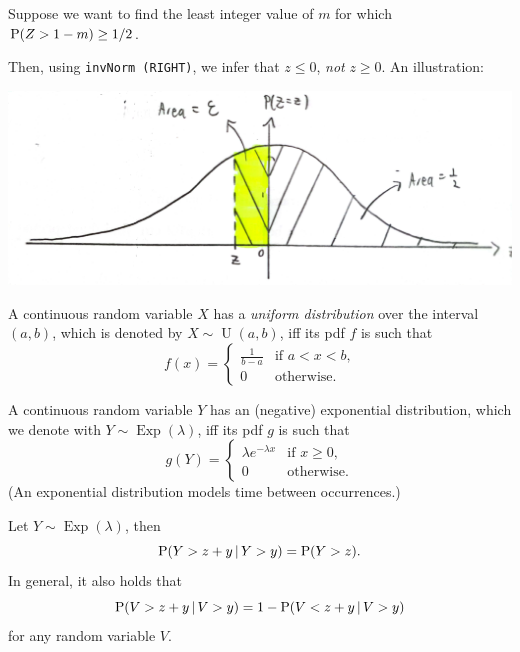 \documentclass[../Notes.tex]{subfiles}
\begin{document}
\begin{example}{}{}
  Suppose we want to find the least integer value of \(m\) for which \(\operatorname{P}(Z>1-m)\geq 1/2\).

  Then, using \texttt{invNorm (RIGHT)}, we infer that \(z\leq 0\), \emph{not} \(z\geq 0\). An illustration: 
  \begin{center}
    \includegraphics[width=\textwidth]{../images/Special-Continuous-Random-Variables-Example-Illustration.jpg}
  \end{center}
\end{example}
\begin{definition}{}{}
  A continuous random variable \(X\) has a \emph{uniform distribution} over the interval \((a,b)\), which is denoted by \(X \sim \operatorname{U}(a,b)\), iff its pdf \(f\) is such that
    \[f(x)=\begin{cases}
      \frac{1}{b-a} &\text{if \(a<x<b\),}\\
      0 &\text{otherwise.}
    \end{cases}\] 
\end{definition}
\begin{definition}{}{}
  A continuous random variable \(Y\) has an (negative) exponential distribution, which we denote with \(Y\sim \operatorname{Exp}(\lambda)\), iff its pdf \(g\) is such that
    \[g(Y)=
    \begin{cases}
      \lambda e^{-\lambda x} &\text{if \(x\geq 0\)},\\
      0 &\text{otherwise.}
    \end{cases}\]
  (An exponential distribution models time between occurrences.)
\end{definition}
\begin{note}
  Let \(Y \sim \operatorname{Exp}(\lambda)\), then
  \[\operatorname{P}(Y>z+y \,\vert\, Y>y)=\operatorname{P}(Y>z).\]
  In general, it also holds that 
  \[\operatorname{P}(V>z+y \,\vert\, V>y)=1-\operatorname{P}(V<z+y \,\vert\, V>y)\]
  for any random variable \(V\).
\end{note}
\end{document}
